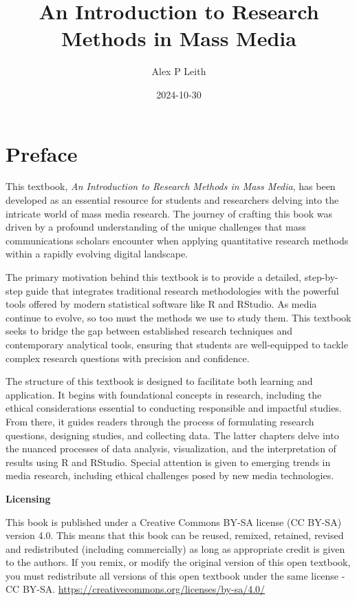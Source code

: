 \documentclass[
]{book}
\title{An Introduction to Research Methods in Mass Media}
\author{Alex P Leith}
\date{2024-10-30}
\begin{document}
\maketitle

{
\setcounter{tocdepth}{1}
\tableofcontents
}
\chapter*{Preface}\label{preface}

This textbook, \emph{An Introduction to Research Methods in Mass Media}, has been developed as an essential resource for students and researchers delving into the intricate world of mass media research. The journey of crafting this book was driven by a profound understanding of the unique challenges that mass communications scholars encounter when applying quantitative research methods within a rapidly evolving digital landscape.

The primary motivation behind this textbook is to provide a detailed, step-by-step guide that integrates traditional research methodologies with the powerful tools offered by modern statistical software like R and RStudio. As media continue to evolve, so too must the methods we use to study them. This textbook seeks to bridge the gap between established research techniques and contemporary analytical tools, ensuring that students are well-equipped to tackle complex research questions with precision and confidence.

The structure of this textbook is designed to facilitate both learning and application. It begins with foundational concepts in research, including the ethical considerations essential to conducting responsible and impactful studies. From there, it guides readers through the process of formulating research questions, designing studies, and collecting data. The latter chapters delve into the nuanced processes of data analysis, visualization, and the interpretation of results using R and RStudio. Special attention is given to emerging trends in media research, including ethical challenges posed by new media technologies.

\textbf{Licensing}

This book is published under a Creative Commons BY-SA license (CC BY-SA) version 4.0. This means that this book can be reused, remixed, retained, revised and redistributed (including commercially) as long as appropriate credit is given to the authors. If you remix, or modify the original version of this open textbook, you must redistribute all versions of this open textbook under the same license - CC BY-SA. \url{https://creativecommons.org/licenses/by-sa/4.0/}
\end{document}
